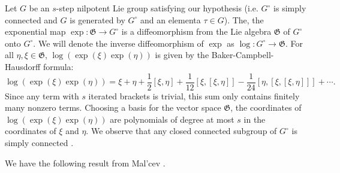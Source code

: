 \documentclass[letter, 11pt]{article}
\theoremstyle{definition}
\theoremstyle{plain}
\newcommand{\1}{\mathbbm{1}}
\begin{document}
Let $G$ be an $s$-step nilpotent Lie group satisfying our hypothesis (i.e. $G^\circ$ is simply connected and $G$ is generated by $G^\circ$ and an elementa $\tau\in G$). The, the exponential map $\exp:\mathfrak{G}\to G^\circ$ is a diffeomorphism from the Lie algebra $\mathfrak{G}$ of $G^\circ$ onto $G^\circ$. We will denote the inverse diffeomorphism of $\exp$ as $\log:G^\circ\to \mathfrak{G}$. For all $\eta,\xi\in \mathfrak{G}$, $\log(\exp(\xi)\exp(\eta))$ is given by the Baker-Campbell-Hausdorff formula:
\begin{equation}\label{BCH}
    \log(\exp(\xi) \exp(\eta))= \xi + \eta + \frac{1}{2} [\xi,\eta] +\frac{1}{12}[\xi,[\xi,\eta]] -\frac{1}{24} [\eta,[\xi,[\xi,\eta]]]+\cdots.
\end{equation}
Since any term with $s$ iterated brackets is trivial, this sum only contains finitely many nonzero terms. Choosing a basis for the vector space $\mathfrak{G}$, the coordinates of $\log(\exp(\xi) \exp(\eta))$ are polynomials of degree at most $s$ in the coordinates of $\xi$ and $\eta$.
We observe that any closed connected subgroup of $G^\circ$ is simply connected \cite[Lemma 10, chapter 10]{Host_Kra_nilpotent_structures_ergodic_theory:2018}.

We have the following result from Mal'cev \cite{Malcev1949}.
\end{document}

